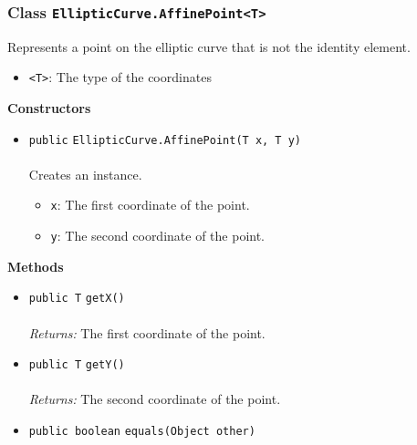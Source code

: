 \subsubsection{Class \lstinline|EllipticCurve.AffinePoint<T>|}
Represents a point on the elliptic curve that is not the identity
 element. \\
\noindent\begin{minipage}[t]{5cm}
\vspace{0.3em}
\hspace*{2em}
\vspace{0.3em}
\end{minipage}

\begin{itemize}
\item \lstinline|<T>|: The type of the coordinates
\end{itemize}



\textbf{\sffamily Constructors}
\begin{itemize}
\item \lstinline|public| \lstinline|EllipticCurve.AffinePoint|\lstinline|(T x, T y)|\\ \\[-0.6em]
Creates an instance.
\begin{itemize}
\item \lstinline|x|: The first coordinate of the point.
\item \lstinline|y|: The second coordinate of the point.
\end{itemize}



\end{itemize}


\textbf{\sffamily Methods}
\begin{itemize}
\item \lstinline|public T| \lstinline|getX|\lstinline|()|\\ \\[-0.6em]
\emph{Returns:} The first coordinate of the point.



\item \lstinline|public T| \lstinline|getY|\lstinline|()|\\ \\[-0.6em]
\emph{Returns:} The second coordinate of the point.



\item \lstinline|public boolean| \lstinline|equals|\lstinline|(Object other)| \\[-0.6em]




\end{itemize}

